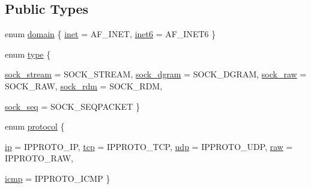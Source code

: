 \subsection*{Public Types}
\begin{CompactItemize}
\item 
enum \hyperlink{classusock_1_1BaseSocket_a51cae0b366638a5f697f64174135d90}{domain} \{ \hyperlink{classusock_1_1BaseSocket_a51cae0b366638a5f697f64174135d904293c75d794987e0017bab42bbbcbf73}{inet} =  AF\_\-INET, 
\hyperlink{classusock_1_1BaseSocket_a51cae0b366638a5f697f64174135d9089db67cd78ea92b1ca5bf823ca967680}{inet6} =  AF\_\-INET6
 \}
\item 
enum \hyperlink{classusock_1_1BaseSocket_8117d25c7b482eb594d68137868ce5f9}{type} \{ \par
\hyperlink{classusock_1_1BaseSocket_8117d25c7b482eb594d68137868ce5f94052647af14af3924e9b994a5ab53b8e}{sock\_\-stream} =  SOCK\_\-STREAM, 
\hyperlink{classusock_1_1BaseSocket_8117d25c7b482eb594d68137868ce5f95b0f0651f7544fbc1fedc8997d914365}{sock\_\-dgram} =  SOCK\_\-DGRAM, 
\hyperlink{classusock_1_1BaseSocket_8117d25c7b482eb594d68137868ce5f9d3b8cbf378c46eb82b5a0039eab34ca7}{sock\_\-raw} =  SOCK\_\-RAW, 
\hyperlink{classusock_1_1BaseSocket_8117d25c7b482eb594d68137868ce5f9e04a390261efe04335235f26a00b72d5}{sock\_\-rdm} =  SOCK\_\-RDM, 
\par
\hyperlink{classusock_1_1BaseSocket_8117d25c7b482eb594d68137868ce5f9adfa1bc59768fc0be580b4ba95c6f357}{sock\_\-seq} =  SOCK\_\-SEQPACKET
 \}
\item 
enum \hyperlink{classusock_1_1BaseSocket_09208675b41c416fb402824742963eaa}{protocol} \{ \par
\hyperlink{classusock_1_1BaseSocket_09208675b41c416fb402824742963eaabf22c7bfd50adb88e468d3744e932497}{ip} =  IPPROTO\_\-IP, 
\hyperlink{classusock_1_1BaseSocket_09208675b41c416fb402824742963eaa3a17ad9b4036c0957dc098c76e8fba2a}{tcp} =  IPPROTO\_\-TCP, 
\hyperlink{classusock_1_1BaseSocket_09208675b41c416fb402824742963eaae0719b1eee901237a5ec0ba9031cdfce}{udp} =  IPPROTO\_\-UDP, 
\hyperlink{classusock_1_1BaseSocket_09208675b41c416fb402824742963eaa0d09509fb52df026fec01b98795f9ac4}{raw} =  IPPROTO\_\-RAW, 
\par
\hyperlink{classusock_1_1BaseSocket_09208675b41c416fb402824742963eaa5c569c4f7525d07ee96857a015d057bb}{icmp} =  IPPROTO\_\-ICMP
 \}
\end{CompactItemize}
